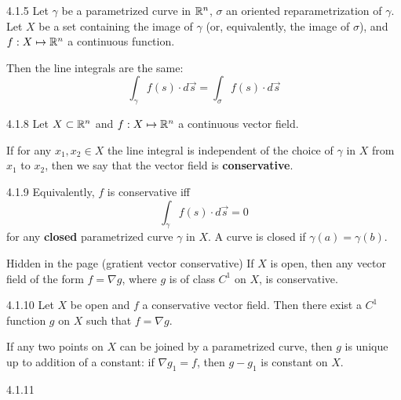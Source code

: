 \begin{proposition}{4.1.5}
    Let $\gamma$ be a parametrized curve in $\mathbb{R}^n$, $\sigma$ an oriented reparametrization of $\gamma$.
    Let $X$ be a set containing the image of $\gamma$ (or, equivalently, the image of $\sigma$),
    and $f: X \mapsto \mathbb{R}^n$ a continuous function.

    Then the line integrals are the same:
    \[ \int_\gamma f(s) \cdot d \vec{s} = \int_\sigma f(s) \cdot d \vec{s} \]
\end{proposition}

\begin{definition}{4.1.8}
    Let $X \subset \mathbb{R}^n$ and $f: X \mapsto \mathbb{R}^n$ a continuous vector field.

    If for any $x_1, x_2 \in X$ the line integral is independent of the choice of $\gamma$ in $X$ from $x_1$ to $x_2$,
    then we say that the vector field is \textbf{conservative}.
\end{definition}

\begin{remark}{4.1.9}
    Equivalently, $f$ is conservative iff
    \[ \int_\gamma f(s) \cdot d\vec{s} = 0 \]
    for any \textbf{closed} parametrized curve $\gamma$ in $X$.
    A curve is closed if $\gamma(a) = \gamma(b)$.
\end{remark}

\begin{theorem}{Hidden in the page (gratient vector conservative)}
    If $X$ is open, then any vector field of the form $f = \nabla g$, where $g$ is of class $C^1$ on $X$, is conservative.
\end{theorem}

\begin{theorem}{4.1.10}
    Let $X$ be open and $f$ a conservative vector field.
    Then there exist a $C^1$ function $g$ on $X$ such that $f = \nabla g$.

    If any two points on $X$ can be joined by a parametrized curve, then $g$ is unique up to addition of a constant:
    if $\nabla g_1 = f$, then $g - g_1$ is constant on $X$.
\end{theorem}

\begin{remark}{4.1.11}
    
\end{remark}